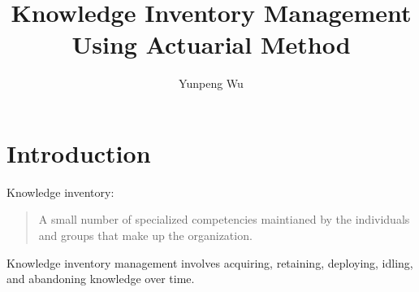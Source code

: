 \documentclass[slidestop,compress,mathserif,table]{beamer}
\begin{document}
\title{Knowledge Inventory Management Using Actuarial Method}
    \author{Yunpeng Wu}
    \begin{frame}
      \titlepage
    \end{frame}

\section{Introduction}
\begin{frame}
Knowledge inventory:
\begin{quote}
 A small number of specialized competencies maintianed by the
 individuals and groups that make up the organization.
\end{quote}
\begin{definition}
 Knowledge inventory management involves acquiring, retaining, deploying, idling, and abandoning knowledge over time.
\end{definition}
\end{frame}
\end{document}
